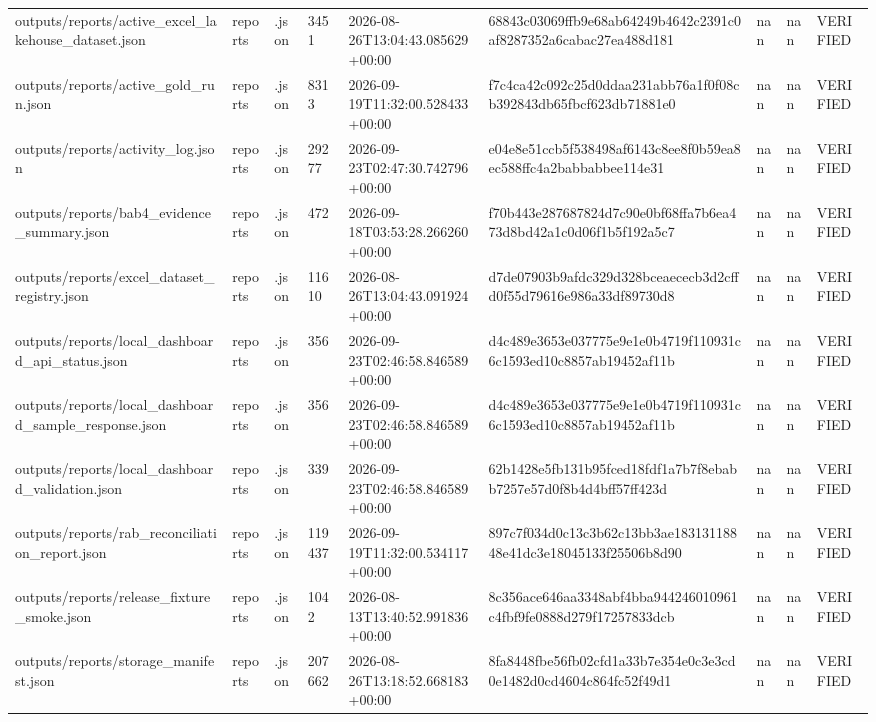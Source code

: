 \begin{longtable}{lllllllll}
outputs/reports/active_excel_lakehouse_dataset.json & reports & .json & 3451 & 2026-08-26T13:04:43.085629+00:00 & 68843c03069ffb9e68ab64249b4642c2391c0af8287352a6cabac27ea488d181 & nan & nan & VERIFIED \\
outputs/reports/active_gold_run.json & reports & .json & 8313 & 2026-09-19T11:32:00.528433+00:00 & f7c4ca42c092c25d0ddaa231abb76a1f0f08cb392843db65fbcf623db71881e0 & nan & nan & VERIFIED \\
outputs/reports/activity_log.json & reports & .json & 29277 & 2026-09-23T02:47:30.742796+00:00 & e04e8e51ccb5f538498af6143c8ee8f0b59ea8ec588ffc4a2babbabbee114e31 & nan & nan & VERIFIED \\
outputs/reports/bab4_evidence_summary.json & reports & .json & 472 & 2026-09-18T03:53:28.266260+00:00 & f70b443e287687824d7c90e0bf68ffa7b6ea473d8bd42a1c0d06f1b5f192a5c7 & nan & nan & VERIFIED \\
outputs/reports/excel_dataset_registry.json & reports & .json & 11610 & 2026-08-26T13:04:43.091924+00:00 & d7de07903b9afdc329d328bceaececb3d2cffd0f55d79616e986a33df89730d8 & nan & nan & VERIFIED \\
outputs/reports/local_dashboard_api_status.json & reports & .json & 356 & 2026-09-23T02:46:58.846589+00:00 & d4c489e3653e037775e9e1e0b4719f110931c6c1593ed10c8857ab19452af11b & nan & nan & VERIFIED \\
outputs/reports/local_dashboard_sample_response.json & reports & .json & 356 & 2026-09-23T02:46:58.846589+00:00 & d4c489e3653e037775e9e1e0b4719f110931c6c1593ed10c8857ab19452af11b & nan & nan & VERIFIED \\
outputs/reports/local_dashboard_validation.json & reports & .json & 339 & 2026-09-23T02:46:58.846589+00:00 & 62b1428e5fb131b95fced18fdf1a7b7f8ebabb7257e57d0f8b4d4bff57ff423d & nan & nan & VERIFIED \\
outputs/reports/rab_reconciliation_report.json & reports & .json & 119437 & 2026-09-19T11:32:00.534117+00:00 & 897c7f034d0c13c3b62c13bb3ae18313118848e41dc3e18045133f25506b8d90 & nan & nan & VERIFIED \\
outputs/reports/release_fixture_smoke.json & reports & .json & 1042 & 2026-08-13T13:40:52.991836+00:00 & 8c356ace646aa3348abf4bba944246010961c4fbf9fe0888d279f17257833dcb & nan & nan & VERIFIED \\
outputs/reports/storage_manifest.json & reports & .json & 207662 & 2026-08-26T13:18:52.668183+00:00 & 8fa8448fbe56fb02cfd1a33b7e354e0c3e3cd0e1482d0cd4604c864fc52f49d1 & nan & nan & VERIFIED \\

\end{longtable}
